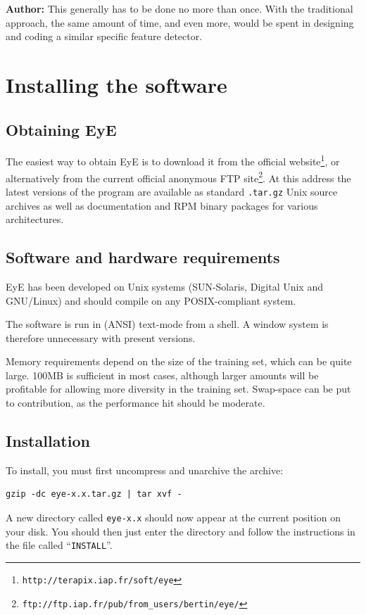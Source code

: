 \documentclass[11pt,titlepage]{article}
\begin{document}
{\bf Author:} This generally has to be done no more than once. With the traditional approach, the same amount of time,
and even more, would be spent in designing and coding a similar specific feature detector.

\section{Installing the software}
\subsection{Obtaining {\sc EyE}}
The easiest way to obtain {\sc EyE} is to download it from the official
website\footnote{\tt http://terapix.iap.fr/soft/eye}, or alternatively from
the current official anonymous FTP
site\footnote{\tt ftp://ftp.iap.fr/pub/from\_users/bertin/eye/}.
At this address the latest versions of the program are available as standard 
{\tt .tar.gz} Unix source archives as well as documentation and RPM binary
packages for various architectures.

\subsection{Software and hardware requirements}
{\sc EyE} has been developed on Unix systems (SUN-Solaris, Digital Unix and GNU/Linux) and should compile on any POSIX-compliant system.

The software is run in (ANSI) text-mode from a shell. A window system is therefore unnecessary with present versions.

Memory requirements depend on the size of the training set, which can be quite large. 100MB is sufficient
in most cases, although larger amounts will be profitable for allowing more diversity in the training set.
Swap-space can be put to contribution, as the performance hit should be moderate.

\subsection{Installation}
To install, you must first uncompress and unarchive the archive:
\begin{verbatim}
gzip -dc eye-x.x.tar.gz | tar xvf -
\end{verbatim}
A new directory called {\tt eye-x.x} should now appear at the current
position on your disk.  You should then just enter the directory and
follow the instructions in the file called ``{\tt INSTALL}''.
\end{document}
